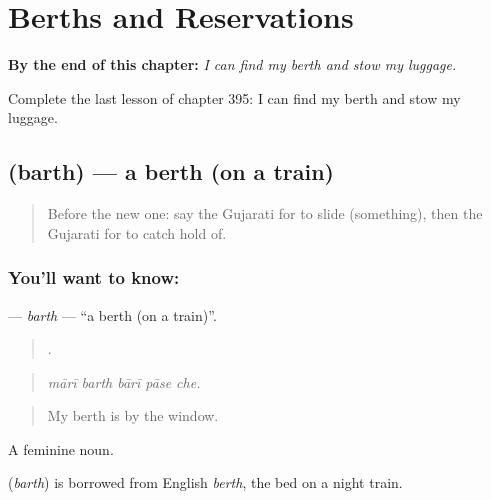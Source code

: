
\chapter{Berths and Reservations}
\label{ch:gu-berths-and-reservations}

\begin{chapteropening}
\textbf{By the end of this chapter:} \emph{I can find my berth and stow my luggage.}

Complete the last lesson of chapter 395: I can find my berth and stow my luggage.
\end{chapteropening}

\section[\texorpdfstring{\gu{બર્થ} (barth)}{બર્થ (barth)}]{ (barth) — a berth (on a train)}

\label{lesson:GU-C395-barth}



\begin{quote}
Before the new one: say the Gujarati for to slide (something), then the Gujarati for to catch hold of.
\end{quote}

\subsection*{You'll want to know: }
\textbf{} — \emph{barth} — \textquotedblleft{}a berth (on a train)\textquotedblright{}.

\begin{quote}
    .
\end{quote}

\begin{quote}
\emph{mārī barth bārī pāse che.}
\end{quote}

\begin{quote}
My berth is by the window.
\end{quote}

A feminine noun.

\begin{cousinweb}
\textbf{} (\emph{barth}) is borrowed from English \emph{berth}, the bed on a night train.
\end{cousinweb}

